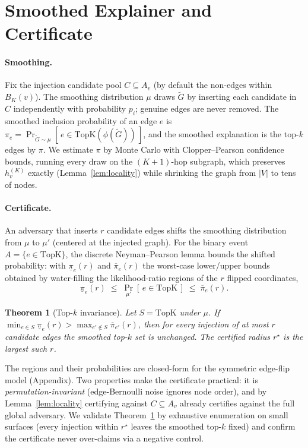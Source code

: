 \documentclass[11pt]{article}
\newtheorem{theorem}{Theorem}
\begin{document}
\section{Smoothed Explainer and Certificate}
\paragraph{Smoothing.} Fix the injection candidate pool $C\subseteq A_v$ (by
default the non-edges within $B_K(v)$). The smoothing distribution $\mu$ draws
$\tilde G$ by inserting each candidate in $C$ independently with probability
$p_i$; genuine edges are never removed. The smoothed inclusion probability of an
edge $e$ is $\pi_e = \Pr_{\tilde G\sim\mu}[\,e\in\mathrm{TopK}(\phi(\tilde G))\,]$,
and the smoothed explanation is the top-$k$ edges by $\pi$. We estimate $\pi$ by
Monte Carlo with Clopper--Pearson confidence bounds, running every draw on the
$(K{+}1)$-hop subgraph, which preserves $h_v^{(K)}$ exactly (Lemma~\ref{lem:locality})
while shrinking the graph from $|V|$ to tens of nodes.

\paragraph{Certificate.} An adversary that inserts $r$ candidate edges shifts the
smoothing distribution from $\mu$ to $\mu'$ (centered at the injected graph). For
the binary event $A=\{e\in\mathrm{TopK}\}$, the discrete Neyman--Pearson lemma
bounds the shifted probability: with $\underline\pi_e(r)$ and $\overline\pi_e(r)$
the worst-case lower/upper bounds obtained by water-filling the likelihood-ratio
regions of the $r$ flipped coordinates,
\[
  \underline\pi_e(r) \;\le\; \Pr_{\mu'}[\,e\in\mathrm{TopK}\,] \;\le\; \overline\pi_e(r).
\]
\begin{theorem}[Top-$k$ invariance]\label{thm:cert}
Let $S=\mathrm{TopK}$ under $\mu$. If
$\min_{e\in S}\underline\pi_e(r) > \max_{e'\notin S}\overline\pi_{e'}(r)$,
then for every injection of at most $r$ candidate edges the smoothed top-$k$ set
is unchanged. The certified radius $r^\star$ is the largest such $r$.
\end{theorem}
The regions and their probabilities are closed-form for the symmetric edge-flip
model (Appendix). Two properties make the certificate practical: it is
\emph{permutation-invariant} (edge-Bernoulli noise ignores node order), and by
Lemma~\ref{lem:locality} certifying against $C\subseteq A_v$ already certifies
against the full global adversary. We validate Theorem~\ref{thm:cert} by
exhaustive enumeration on small surfaces (every injection within $r^\star$ leaves
the smoothed top-$k$ fixed) and confirm the certificate never over-claims via a
negative control.
\end{document}
